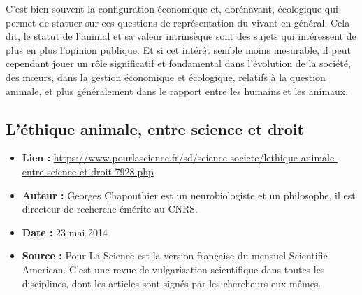 \documentclass[10pt]{article}
\begin{document}
C’est bien souvent la configuration économique et, dorénavant, écologique qui permet de statuer sur ces questions de représentation du vivant en général. Cela dit, le statut de l’animal et sa valeur intrinsèque sont des sujets qui intéressent de plus en plus l’opinion publique. Et si cet intérêt semble moins mesurable, il peut cependant jouer un rôle significatif et fondamental dans l’évolution de la société, des mœurs, dans la gestion économique et écologique, relatifs à la question animale, et plus généralement dans le rapport entre les humains et les animaux.


\subsection{L'éthique animale, entre science et droit}
\begin{itemize}
	\item \textbf{Lien : }  \url{https://www.pourlascience.fr/sd/science-societe/lethique-animale-entre-science-et-droit-7928.php} 
	\item \textbf{Auteur : } Georges Chapouthier est un neurobiologiste et un philosophe, il est directeur de recherche émérite au CNRS.
	\item \textbf{Date : } 23 mai 2014
	\item \textbf{Source : } Pour La Science est la version française du mensuel Scientific American. C'est une revue de vulgarisation scientifique dans toutes les disciplines, dont les articles sont signés par les chercheurs eux-mêmes.
\end{itemize}


\end{document}
